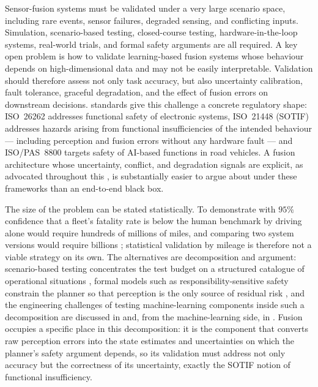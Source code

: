 Sensor-fusion systems must be validated under a very large scenario space, including rare events, sensor failures, degraded sensing, and conflicting inputs. Simulation, scenario-based testing, closed-course testing, hardware-in-the-loop systems, real-world trials, and formal safety arguments are all required. A key open problem is how to validate learning-based fusion systems whose behaviour depends on high-dimensional data and may not be easily interpretable. Validation should therefore assess not only task accuracy, but also uncertainty calibration, fault tolerance, graceful degradation, and the effect of fusion errors on downstream decisions.  standards give this challenge a concrete regulatory shape: ISO~26262 addresses functional safety of electronic systems, ISO~21448 (SOTIF) addresses hazards arising from functional insufficiencies of the intended behaviour --- including perception and fusion errors without any hardware fault --- and ISO/PAS~8800 targets safety of AI-based functions in road vehicles. A fusion architecture whose uncertainty, conflict, and degradation signals are explicit, as advocated throughout this , is substantially easier to argue about under these frameworks than an end-to-end black box. %

The size of the problem can be stated statistically. To demonstrate with $95\%$ confidence that a fleet's fatality rate is below the human benchmark by driving alone would require hundreds of millions of miles, and comparing two system versions would require billions \cite{kalra2016_miles}; statistical validation by mileage is therefore not a viable strategy on its own. The alternatives are decomposition and argument: scenario-based testing concentrates the test budget on a structured catalogue of operational situations \cite{riedmaier2020_scenario}, formal models such as responsibility-sensitive safety constrain the planner so that perception is the only source of residual risk \cite{shalevshwartz2017_rss}, and the engineering challenges of testing machine-learning components inside such a decomposition are discussed in \cite{koopman2016_testing} and, from the machine-learning side, in \cite{amodei2016_concrete}. Fusion occupies a specific place in this decomposition: it is the component that converts raw perception errors into the state estimates and uncertainties on which the planner's safety argument depends, so its validation must address not only accuracy but the correctness of its uncertainty, exactly the SOTIF notion of functional insufficiency.

